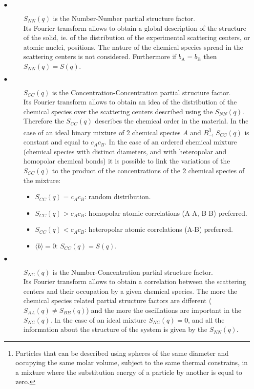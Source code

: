 \begin{description}
\item[$\bullet$] $S_{NN}(q)$ is the Number-Number partial structure factor. \\
Its Fourier transform allows to obtain a global description of the structure of the solid, ie. of the distribution of the experimental scattering centers, or atomic nuclei, positions. 
The nature of the chemical species spread in the scattering centers is not considered. 
Furthermore if $b_\text{A} =b_\text{B}$ then $S_{NN}(q) = S(q)$. 
\item[$\bullet$] $S_{CC}(q)$ is the Concentration-Concentration partial structure factor. \\
Its Fourier transform allows to obtain an idea of the distribution of the chemical species over the scattering centers described using the $S_{NN}(q)$. 
Therefore the $S_{CC}(q)$ describes the chemical order in the material. 
In the case of an ideal binary mixture of 2 chemical species $A$ and $B$\footnote{Particles that can be described using spheres of the same diameter and occupying the same molar volume, subject to the same thermal constrains, in a mixture where the substitution energy of a particle by another is equal to zero.}, $S_{CC}(q)$ is constant and equal to $c_Ac_B$. 
In the case of an ordered chemical mixture (chemical species with distinct diameters, and with heteropolar and homopolar chemical bonds) it is possible to link the variations of the $S_{CC}(q)$ to the product of the concentrations of the 2 chemical species of the mixture:
\begin{itemize}
\item $S_{CC}(q) = c_Ac_B$: random distribution. 
\item $S_{CC}(q) > c_Ac_B$: homopolar atomic correlations (A-A, B-B) preferred.
\item $S_{CC}(q) < c_Ac_B$: heteropolar atomic correlations (A-B) preferred.
\item $\langle b \rangle = 0$: $S_{CC}(q) = S(q)$.
\end{itemize}
\item[$\bullet$] $S_{NC}(q)$ is the Number-Concentration partial structure factor. \\
Its Fourier transform allows to obtain a correlation between the scattering centers and their occupation by a given chemical species. 
The more the chemical species related partial structure factors are different ($S_{AA}(q) \ne S_{BB}(q)$) and the more the oscillations are important in the $S_{NC}(q)$. 
In the case of an ideal mixture $S_{NC}(q) = 0$, and all the information about the structure of the system is given by the $S_{NN}(q)$. 
\end{description}
